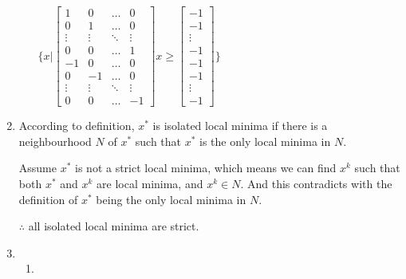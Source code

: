 \documentclass[12pt]{article}
\begin{document}
\begin{enumerate}
\begin{enumerate}
$ \{ x | \begin{bmatrix} 1 & 0 & \hdots & 0 \\ 0 & 1 & \hdots & 0 \\ \vdots & \vdots & \ddots & \vdots \\ 0 & 0 & \hdots & 1 \\
-1 & 0 & \hdots & 0 \\ 0 & -1 & \hdots & 0 \\ \vdots & \vdots & \ddots & \vdots \\ 0 & 0 & \hdots & -1 
\end{bmatrix} x \ge  \begin{bmatrix} -1 \\ -1 \\ \vdots \\ -1 \\ -1 \\ -1 \\ \vdots \\ -1 \end{bmatrix} \}$

\end{enumerate}













\bigskip
\item

According to definition, $x^*$ is isolated local minima if there is a neighbourhood $N$ of $x^*$ such that $x^*$ is the only local minima in $N$.

Assume $x^*$ is not a strict local minima, which means we can find $x^k$ such that both $x^*$ and $x^k$ are local minima, and $x^k \in N$. And this contradicts with the definition of $x^*$ being the only local minima in $N$.

$\therefore$ all isolated local minima are strict.


















\bigskip
\item
\begin{enumerate}
\item


\end{enumerate}
\end{enumerate}
\end{document}
